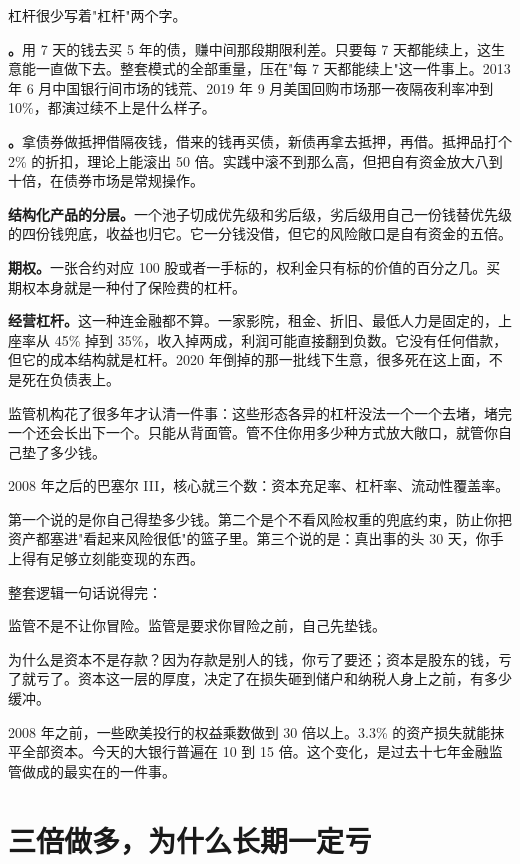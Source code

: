 杠杆很少写着"杠杆"两个字。

\textbf{。}用 7 天的钱去买 5 年的债，赚中间那段期限利差。只要每 7 天都能续上，这生意能一直做下去。整套模式的全部重量，压在"每 7 天都能续上"这一件事上。2013 年 6 月中国银行间市场的钱荒、2019 年 9 月美国回购市场那一夜隔夜利率冲到 10\%，都演过续不上是什么样子。

\textbf{。}拿债券做抵押借隔夜钱，借来的钱再买债，新债再拿去抵押，再借。抵押品打个 2\% 的折扣，理论上能滚出 50 倍。实践中滚不到那么高，但把自有资金放大八到十倍，在债券市场是常规操作。

\textbf{结构化产品的分层。}一个池子切成优先级和劣后级，劣后级用自己一份钱替优先级的四份钱兜底，收益也归它。它一分钱没借，但它的风险敞口是自有资金的五倍。

\textbf{期权。}一张合约对应 100 股或者一手标的，权利金只有标的价值的百分之几。买期权本身就是一种付了保险费的杠杆。

\textbf{经营杠杆。}这一种连金融都不算。一家影院，租金、折旧、最低人力是固定的，上座率从 45\% 掉到 35\%，收入掉两成，利润可能直接翻到负数。它没有任何借款，但它的成本结构就是杠杆。2020 年倒掉的那一批线下生意，很多死在这上面，不是死在负债表上。

监管机构花了很多年才认清一件事：这些形态各异的杠杆没法一个一个去堵，堵完一个还会长出下一个。只能从背面管。管不住你用多少种方式放大敞口，就管你自己垫了多少钱。

2008 年之后的巴塞尔 III，核心就三个数：资本充足率、杠杆率、流动性覆盖率。

第一个说的是你自己得垫多少钱。第二个是个不看风险权重的兜底约束，防止你把资产都塞进"看起来风险很低"的篮子里。第三个说的是：真出事的头 30 天，你手上得有足够立刻能变现的东西。

整套逻辑一句话说得完：

\begin{pullquote}{}
监管不是不让你冒险。监管是要求你冒险之前，自己先垫钱。
\end{pullquote}

为什么是资本不是存款？因为存款是别人的钱，你亏了要还；资本是股东的钱，亏了就亏了。资本这一层的厚度，决定了在损失砸到储户和纳税人身上之前，有多少缓冲。

2008 年之前，一些欧美投行的权益乘数做到 30 倍以上。3.3\% 的资产损失就能抹平全部资本。今天的大银行普遍在 10 到 15 倍。这个变化，是过去十七年金融监管做成的最实在的一件事。

\section{三倍做多，为什么长期一定亏}

